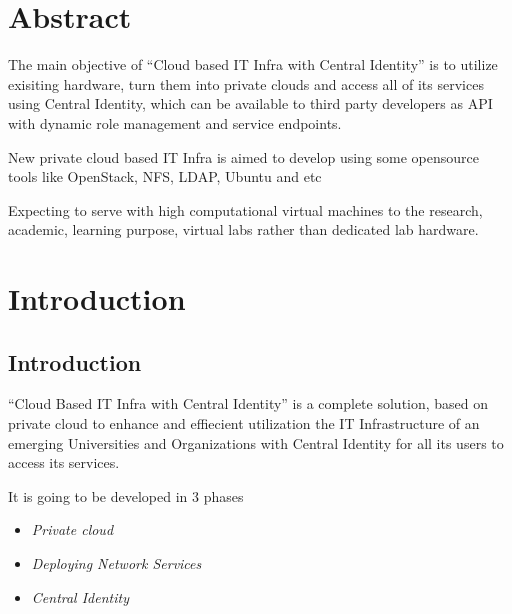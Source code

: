 \documentclass[12pt]{report}
\begin{document}
 
\chapter*{Abstract}
\setcounter{page}{1}
\normalsize
\hspace{0.5cm} The main objective of ``Cloud based IT Infra with Central Identity'' is to utilize exisiting hardware, turn them into private clouds and access all of its services using 
Central Identity, which can be available to third party developers as API with dynamic role management and service endpoints. \newline

New private cloud based IT Infra is aimed to develop using some opensource tools like OpenStack, NFS, LDAP, Ubuntu and etc \newline

Expecting to serve with high computational virtual machines to the research, academic, learning purpose, virtual labs rather than dedicated lab hardware.


\setcounter{page}{2}
\tableofcontents
\listoffigures
\listoftables
\pagebreak \thispagestyle{empty} \pagebreak

 
\setcounter{page}{1}


\chapter{Introduction}

\section{Introduction}
	``Cloud Based IT Infra with Central Identity'' is a complete solution, based on private cloud to enhance and effiecient utilization the IT Infrastructure of an emerging Universities and Organizations with Central Identity for all its users to access its services.\newline

	It is going to be developed in 3 phases 
	\begin{itemize}
		\item \textit{Private cloud} 
		\item \textit{Deploying Network Services} 
		\item \textit{Central Identity}
	\end{itemize}
	
\end{document}
